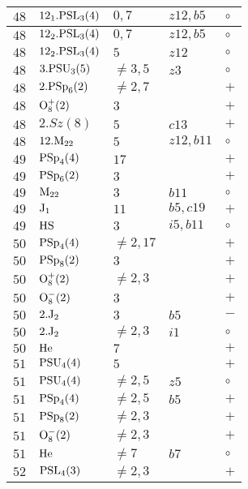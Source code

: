 \documentclass[a4paper, 11pt]{article}
\begin{document}
\begin{longtable}{lllll}
		$48$ & $12_1.{\rm PSL}_{3}(4)$ & $0,7$ & $z12,b5$ & $\circ$ \\ \hline
		$48$ & $12_2.{\rm PSL}_{3}(4)$ & $0,7$ & $z12, b5$ & $\circ$ \\ \hline
		$48$ & $12_2.{\rm PSL}_{3}(4)$ & $5$ & $z12$ & $\circ$ \\ \hline
		$48$ & $3.{\rm PSU}_{3}(5)$ & $\neq 3,5$ & $z3$ & $\circ$ \\ \hline
		$48$ & $2.{\rm PSp}_{6}(2)$ & $\neq 2,7$ &  & $+$ \\ \hline
		$48$ & ${\rm O}_{8}^+(2)$ & $3$ &  & $+$ \\ \hline
		$48$ & $2.Sz(8)$ & $5$ & $c13$ & $+$ \\ \hline
		$48$ & $12.{\rm M}_{22}$ & $5$ & $z12, b11$ & $\circ$ \\ \hline
		$49$ & ${\rm PSp}_{4}(4)$ & $17$ &  & $+$ \\ \hline
		$49$ & ${\rm PSp}_{6}(2)$ & $3$ &  & $+$ \\ \hline
		$49$ & ${\rm M}_{22}$ & $3$ & $b11$ & $\circ$ \\ \hline
		$49$ & ${\rm J}_1$ & $11$ & $b5, c19$ & $+$ \\ \hline
		$49$ & ${\rm HS}$ & $3$ & $i5, b11$ & $\circ$ \\ \hline
		$50$ & ${\rm PSp}_{4}(4)$ & $\neq 2,17$ &  & $+$ \\ \hline
		$50$ & ${\rm PSp}_{8}(2)$ & $3$ &  & $+$ \\ \hline
		$50$ & ${\rm O}_{8}^+(2)$ & $\neq 2,3$ &  & $+$ \\ \hline
		$50$ & ${\rm O}_{8}^-(2)$ & $3$ &  & $+$ \\ \hline
		$50$ & $2.{\rm J}_2$ & $3$ & $b5$ & $-$ \\ \hline
		$50$ & $2.{\rm J}_2$ & $\neq 2,3$ & $i1$ & $\circ$ \\ \hline
		$50$ & ${\rm He}$ & $7$ &  & $+$ \\ \hline
		$51$ & ${\rm PSU}_{4}(4)$ & $5$ &  & $+$ \\ \hline
		$51$ & ${\rm PSU}_{4}(4)$ & $\neq 2,5$ & $z5$ & $\circ$ \\ \hline
		$51$ & ${\rm PSp}_{4}(4)$ & $\neq 2,5$ & $b5$ & $+$ \\ \hline
		$51$ & ${\rm PSp}_{8}(2)$ & $\neq 2,3$ &  & $+$ \\ \hline
		$51$ & ${\rm O}_{8}^-(2)$ & $\neq 2,3$ &  & $+$ \\ \hline
		$51$ & ${\rm He}$ & $\neq 7$ & $b7$ & $\circ$ \\ \hline
		$52$ & ${\rm PSL}_{4}(3)$ & $\neq 2,3$ &  & $+$ \\ \hline

\end{longtable}
\end{document}
